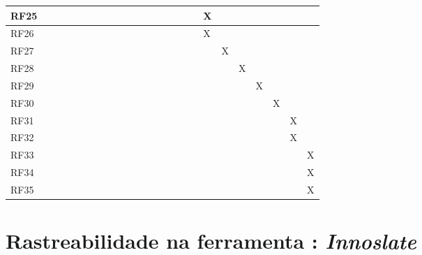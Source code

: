 \begin{table}[htb]
\begin{tabular}{|l|l|l|l|l|l|l|l|l|l|l|l|l|l|l|l|l|l|l|l|l|l|l|l|}
RF25&      &      &      &      &      &      &      &      &      &      &      &      &      &      &      &      &   X   &      &      &      &      &      &      \\ \hline
RF26&      &      &      &      &      &      &      &      &      &      &      &      &      &      &      &      &   X   &      &      &      &      &      &      \\ \hline
RF27&      &      &      &      &      &      &      &      &      &      &      &      &      &      &      &      &      &   X   &      &      &      &      &      \\ \hline
RF28&      &      &      &      &      &      &      &      &      &      &      &      &      &      &      &      &      &      &   X   &      &      &      &      \\ \hline
RF29&      &      &      &      &      &      &      &      &      &      &      &      &      &      &      &      &      &      &      &   X   &      &      &      \\ \hline
RF30&      &      &      &      &      &      &      &      &      &      &      &      &      &      &      &      &      &      &      &      &   X   &      &      \\ \hline
RF31&      &      &      &      &      &      &      &      &      &      &      &      &      &      &      &      &      &      &      &      &      &  X    &      \\ \hline
RF32&      &      &      &      &      &      &      &      &      &      &      &      &      &      &      &      &      &      &      &      &      &   X   &      \\ \hline
RF33&      &      &      &      &      &      &      &      &      &      &      &      &      &      &      &      &      &      &      &      &      &      &  X    \\ \hline
RF34&      &      &      &      &      &      &      &      &      &      &      &      &      &      &      &      &      &      &      &      &      &      &  X    \\ \hline
RF35&      &      &      &      &      &      &      &      &      &      &      &      &      &      &      &      &      &      &      &      &      &      &  X    \\ \hline
\end{tabular}
\end{table}

\section{Rastreabilidade na ferramenta : \textit{Innoslate} }

